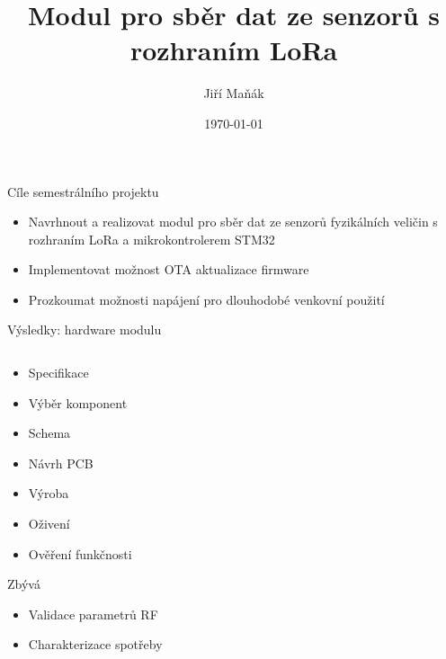 \documentclass{beamer}
\title{Modul pro sběr dat ze senzorů s rozhraním LoRa}
\author{Jiří Maňák}
\institute[]{vedoucí: prof. Ing. Radislav Šmíd, Ph. D.}
\date{\today}
\begin{document}
\begin{frame}
\titlepage
\end{frame}


\begin{frame}{Cíle semestrálního projektu}
\begin{itemize}
    \item Navrhnout a realizovat modul pro sběr dat ze senzorů fyzikálních veličin s rozhraním LoRa a mikrokontrolerem STM32
    \item Implementovat možnost OTA aktualizace firmware
    \item Prozkoumat možnosti napájení pro dlouhodobé venkovní použití
\end{itemize}
\end{frame}


\begin{frame}{Výsledky: hardware modulu}
\begin{columns}[T]
\begin{column}{.45\textwidth}
    \begin{itemize}
        \item Specifikace
        \item Výběr komponent
        \item Schema
        \item Návrh PCB
        \item Výroba
        \item Oživení
        \item Ověření funkčnosti
    \end{itemize}
    Zbývá
    \begin{itemize}
        \item Validace parametrů RF
        \item Charakterizace spotřeby
    \end{itemize}
\end{column}%
\hfill%
\begin{column}{.55\textwidth}
    \begin{figure}[h]
        \centering

\end{figure}
\end{column}
\end{columns}
\end{frame}
\end{document}

